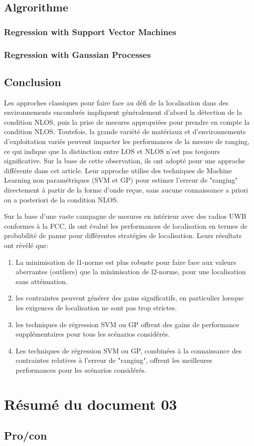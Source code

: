 \subsection{Algrorithme}
\subsubsection{Regression with Support Vector Machines}
\subsubsection{Regression with Gaussian Processes}

\subsection{Conclusion}
Les approches classiques pour faire face au défi de la localisation dans des environnements encombrés impliquent généralement d'abord la détection de la condition NLOS, puis la prise de mesures appropriées pour prendre en compte la condition NLOS. Toutefois, la grande variété de matériaux et d’environnements d’exploitation variés peuvent impacter les performances de la mesure de ranging, ce qui indique que la distinction entre LOS et NLOS n’est pas toujours significative. Sur la base de cette observation, ils ont adopté pour une approche différente dans cet article. Leur approche utilise des techniques de Machine Learning non paramétriques (SVM et GP) pour estimer l’erreur de "ranging" directement à partir de la forme d’onde reçue, sans aucune connaissance a priori ou a posteriori de la condition NLOS. 

Sur la base d'une vaste campagne de mesures en intérieur avec des radios UWB conformes à la FCC, ils ont évalué les performances de localisation en termes de probabilité de panne pour différentes stratégies de localisation. Leurs résultats ont révélé que: 

\begin{enumerate}
	\item La minimisation de l1-norme est plus robuste pour faire face aux valeurs aberrantes (outliers) que la minimisation de l2-norme, pour une localisation sans atténuation.
	\item les contraintes peuvent générer des gains significatifs, en particulier lorsque les exigences de localisation ne sont pas trop strictes.
	\item les techniques de régression SVM ou GP offrent des gains de performance supplémentaires pour tous les scénarios considérés.
	\item Les techniques de régression SVM ou GP, combinées à la connaissance des contraintes relatives à l'erreur de "ranging", offrent les meilleures performances pour les scénarios considérés.
\end{enumerate}

\section{Résumé du document 03}
\subsection{Pro/con}